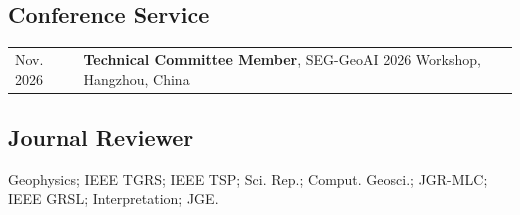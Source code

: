\subsection*{Conference Service}

\begin{longtable}{@{}p{}p{}@{}}
Nov. 2026 & \textbf{Technical Committee Member}, SEG-GeoAI 2026 Workshop, Hangzhou, China \\
\end{longtable}

\subsection*{Journal Reviewer}

Geophysics; IEEE TGRS; IEEE TSP; Sci. Rep.; Comput. Geosci.;
JGR-MLC; IEEE GRSL; Interpretation; JGE.
